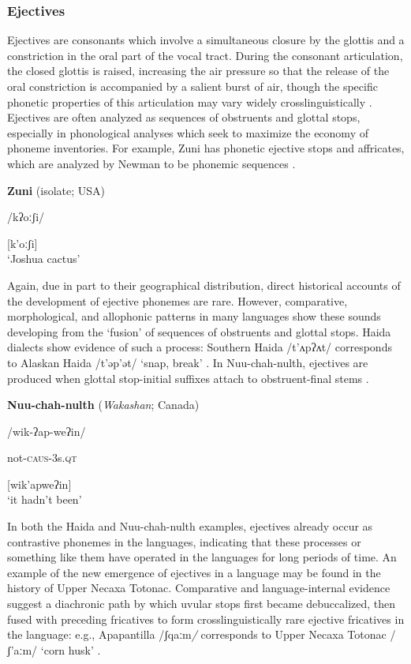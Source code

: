 \subsubsection{\rmfamily\bfseries} 
\subsubsection{{Ejectives} }\label{sec:4.5.2.3}

  Ejectives are consonants which involve a simultaneous closure by the glottis and a constriction in the oral part of the vocal tract. During the consonant articulation, the closed glottis is raised, increasing the air pressure so that the release of the oral constriction is accompanied by a salient burst of air, though the specific phonetic properties of this articulation may vary widely crosslinguistically \citep{Lindau1984}. Ejectives are often analyzed as sequences of obstruents and glottal stops, especially in phonological analyses which seek to maximize the economy of phoneme inventories. For example, Zuni has phonetic ejective stops and affricates, which are analyzed by Newman to be phonemic sequences .

\ea\label{ex:4.42}
  \textbf{Zuni} (isolate; USA)

/kʔoːʃi/

[k’oːʃi]\\
\glt ‘Joshua cactus’
\citep[16]{Newman1965}
\z

  Again, due in part to their geographical distribution, direct historical accounts of the development of ejective phonemes are rare. However, comparative, morphological, and allophonic patterns in many languages show these sounds developing from the ‘fusion’ of sequences of obstruents and glottal stops. Haida dialects show evidence of such a process: Southern Haida /t’ʌpʔʌt/ corresponds to Alaskan Haida /t’əp’ət/ ‘snap, break’ \citep[312]{Fallon2002}. In Nuu-chah-nulth, ejectives are produced when glottal stop-initial suffixes attach to obstruent-final stems .

\ea\label{ex:4.43}
  \textbf{Nuu-chah-nulth} (\textit{Wakashan}; Canada)

/wik-ʔap-weʔin/

not-\textsc{caus}-3s.\textsc{qt}

[wik’apweʔin]\\
\glt ‘it hadn’t been’
\citep[69]{Stonham1999}
\z

  In both the Haida and Nuu-chah-nulth examples, ejectives already occur as contrastive phonemes in the languages, indicating that these processes or something like them have operated in the languages for long periods of time. An example of the new emergence of ejectives in a language may be found in the history of Upper Necaxa Totonac. Comparative and language-internal evidence suggest a diachronic path by which uvular stops first became debuccalized, then fused with preceding fricatives to form crosslinguistically rare ejective fricatives in the language: e.g., Apapantilla /ʃqaːm\textit{/} corresponds to Upper Necaxa Totonac /ʃ’aːm/ ‘corn husk’ \citep[6]{Beck2006}.

